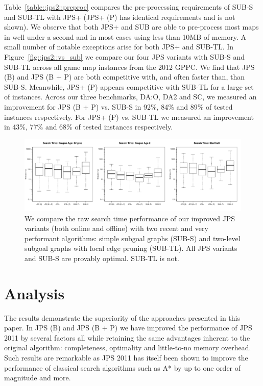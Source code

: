 Table~\ref{table::jps2::preproc} compares the pre-processing requirements of 
SUB-S and SUB-TL with JPS+ (JPS+ (P) has identical requirements and is not shown). 
We observe that both JPS+ and SUB are able to pre-process most maps in well under a second 
and in most cases using less than 10MB of memory. A small number of notable exceptions 
arise for both JPS+ and SUB-TL.
In Figure~\ref{fig::jps2::vs_sub} we compare our four JPS variants with SUB-S and SUB-TL across all
game map instances from the 2012 GPPC. We find that JPS (B) and JPS (B + P) are both
competitive with, and often faster than, than SUB-S. Meanwhile, JPS+ (P) appears competitive 
with SUB-TL for a large set of instances.
Across our three benchmarks, DA:O, DA2 and SC, we measured an improvement for 
JPS (B + P) vs. SUB-S in 92\%, 84\% and 89\% of tested instances respectively.
For JPS+ (P) vs. SUB-TL we measured an improvement in 43\%, 77\% and 68\% of 
tested instances respectively.

\begin{figure}[tb] 
\begin{center}
		   \includegraphics[width=\columnwidth, trim = 0mm 0mm 0mm 0mm]
			{chapter_jps2/diagrams/jps_vs_sub_boxplot.pdf}
       \end{center}
	   \caption{We compare the raw search time performance of our improved JPS variants (both online
		   and offline) with two recent and very performant algorithms: simple subgoal graphs (SUB-S) 
		   and two-level subgoal graphs with local edge pruning (SUB-TL). All JPS variants and SUB-S 
		   are provably optimal. SUB-TL is not.}
\label{fig::vs_sub}
\end{figure}

\section{Analysis}
The results demonstrate the superiority of the approaches presented in this
paper. In JPS (B) and JPS (B + P) we have improved the performance of
JPS 2011 by several factors all while retaining
the same advantages inherent to the original algorithm: completeness, 
optimality and little-to-no memory overhead. Such results are remarkable as
JPS 2011 has itself been shown to improve the performance of classical
search algorithms such as A* by up to one order of magnitude and more.

